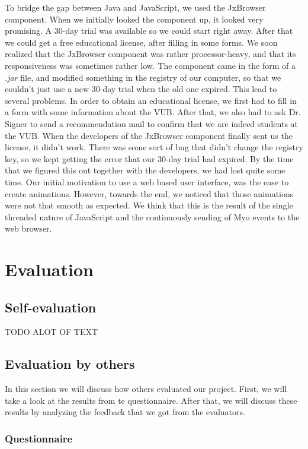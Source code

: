 \documentclass{article}
\begin{document}
To bridge the gap between Java and JavaScript, we used the JxBrowser component. When we initially looked the component up, it looked very promising. A 30-day trial was available so we could start right away. After that we could get a free educational license, after filling in some forms. We soon realized that the JxBrowser component was rather processor-heavy, and that its responsiveness was sometimes rather low. The component came in the form of a \textit{.jar} file, and modified something in the registry of our computer, so that we couldn't just use a new 30-day trial when the old one expired. This lead to several problems. In order to obtain an educational license, we first had to fill in a form with some information about the VUB. After that, we also had to ask Dr. Signer to send a recommendation mail to confirm that we are indeed students at the VUB. When the developers of the JxBrowser component finally sent us the license, it didn't work. There was some sort of bug that didn't change the registry key, so we kept getting the error that our 30-day trial had expired. By the time that we figured this out together with the developers, we had lost quite some time.
Our initial motivation to use a web based user interface, was the ease to create animations. However, towards the end, we noticed that those animations were not that smooth as expected. We think that this is the result of the single threaded nature of JavaScript and the continuously sending of Myo events to the web browser.

\newpage
\section{Evaluation}

\subsection{Self-evaluation}
TODO ALOT OF TEXT

\subsection{Evaluation by others}
In this section we will discuss how others evaluated our project. First, we will take a look at the results from te questionnaire. After that, we will discuss these results by analyzing the feedback that we got from the evaluators.
\newpage
\subsubsection{Questionnaire}
\end{document}
